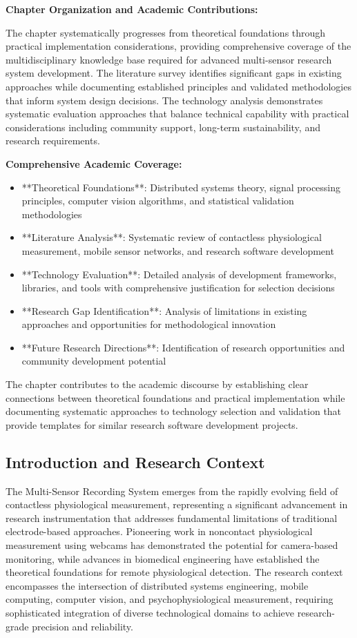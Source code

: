 \documentclass[12pt,a4paper]{report}
\begin{document}
\textbf{Chapter Organization and Academic Contributions:}

The chapter systematically progresses from theoretical foundations through practical implementation considerations,
providing comprehensive coverage of the multidisciplinary knowledge base required for advanced multi-sensor research
system development. The literature survey identifies significant gaps in existing approaches while documenting
established principles and validated methodologies that inform system design decisions. The technology analysis
demonstrates systematic evaluation approaches that balance technical capability with practical considerations including
community support, long-term sustainability, and research requirements.

\textbf{Comprehensive Academic Coverage:}

\begin{itemize}
\item **Theoretical Foundations**: Distributed systems theory, signal processing principles, computer vision algorithms, and
  statistical validation methodologies
\item **Literature Analysis**: Systematic review of contactless physiological measurement, mobile sensor networks, and
  research software development
\item **Technology Evaluation**: Detailed analysis of development frameworks, libraries, and tools with comprehensive
  justification for selection decisions
\item **Research Gap Identification**: Analysis of limitations in existing approaches and opportunities for methodological
  innovation
\item **Future Research Directions**: Identification of research opportunities and community development potential

\end{itemize}
The chapter contributes to the academic discourse by establishing clear connections between theoretical foundations and
practical implementation while documenting systematic approaches to technology selection and validation that provide
templates for similar research software development projects.

\subsection{Introduction and Research Context}

The Multi-Sensor Recording System emerges from the rapidly evolving field of contactless physiological measurement,
representing a significant advancement in research instrumentation that addresses fundamental limitations of traditional
electrode-based approaches. Pioneering work in noncontact physiological measurement using webcams has demonstrated the
potential for camera-based monitoring, while advances in biomedical engineering have established the theoretical
foundations for remote physiological detection. The research context encompasses the intersection of distributed systems
engineering, mobile computing, computer vision, and psychophysiological measurement, requiring sophisticated integration
of diverse technological domains to achieve research-grade precision and reliability.
\end{document}
